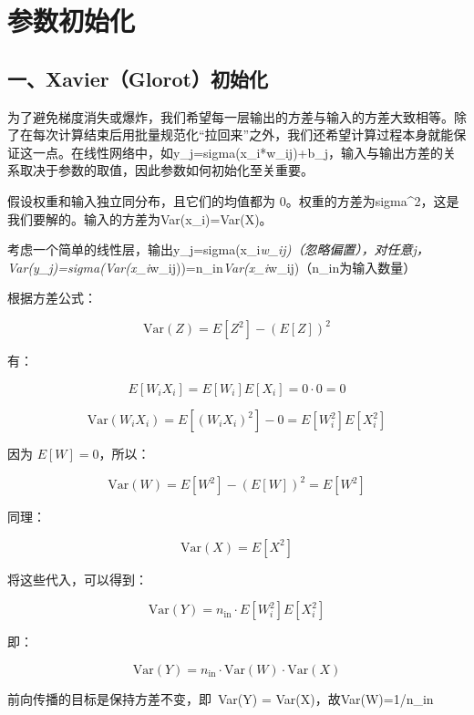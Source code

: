 \setcounter{section}{3}

\hypertarget{ux53c2ux6570ux521dux59cbux5316}{%
\section{参数初始化}\label{ux53c2ux6570ux521dux59cbux5316}}

\hypertarget{ux4e00xavierglorotux521dux59cbux5316}{%
\subsection{一、Xavier（Glorot）初始化}\label{ux4e00xavierglorotux521dux59cbux5316}}

为了避免梯度消失或爆炸，我们希望每一层输出的方差与输入的方差大致相等。除了在每次计算结束后用批量规范化``拉回来''之外，我们还希望计算过程本身就能保证这一点。在线性网络中，如y\_j=sigma(x\_i*w\_ij)+b\_j，输入与输出方差的关系取决于参数的取值，因此参数如何初始化至关重要。

假设权重和输入独立同分布，且它们的均值都为 0。权重的方差为sigma\^{}2，这是我们要解的。输入的方差为Var(x\_i)=Var(X)。

考虑一个简单的线性层，输出y\_j=sigma(x\_i\emph{w\_ij)（忽略偏置），对任意j，Var(y\_j)=sigma(Var(x\_i}w\_ij))=n\_in\emph{Var(x\_i}w\_ij)（n\_in为输入数量）

根据方差公式：

\[
\mathrm{Var}(Z)=E[Z^2]-(E[Z])^2
\]

有：

\[
E[W_iX_i]=E[W_i]E[X_i]=0\cdot 0=0
\]

\[
\mathrm{Var}(W_iX_i)
=E[(W_iX_i)^2]-0
=E[W_i^2]E[X_i^2]
\]

因为 \(E[W]=0\)，所以：

\[
\mathrm{Var}(W)=E[W^2]-(E[W])^2=E[W^2]
\]

同理：

\[
\mathrm{Var}(X)=E[X^2]
\]

将这些代入，可以得到：

\[
\mathrm{Var}(Y)=n_{\mathrm{in}}\cdot E[W_i^2]E[X_i^2]
\]

即：

\[
\mathrm{Var}(Y)=n_{\mathrm{in}}\cdot \mathrm{Var}(W)\cdot \mathrm{Var}(X)
\]

前向传播的目标是保持方差不变，即~Var(Y) = Var(X)，故Var(W)=1/n\_in

